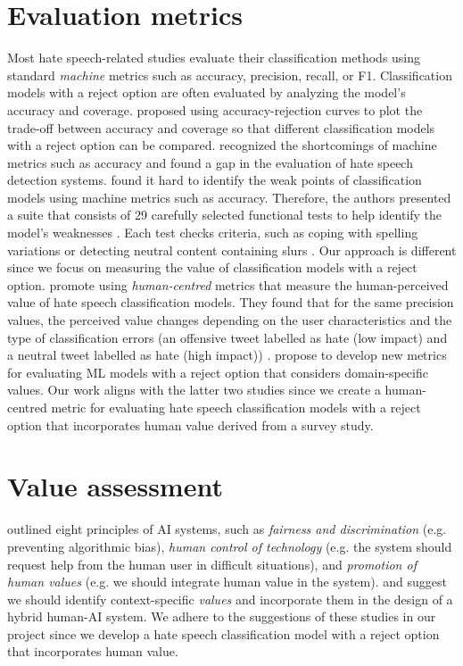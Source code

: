 \section{Evaluation metrics}
\label{sec:related-work-evaluation-metrics}
Most hate speech-related studies evaluate their classification methods using standard \textit{machine} metrics such as accuracy, precision, recall, or F1.
% 
Classification models with a reject option are often evaluated by analyzing the model's accuracy and coverage.
%
\citet{nadeem2009reject} proposed using accuracy-rejection curves to plot the trade-off between accuracy and coverage so that different classification models with a reject option can be compared.
%
\citet{rottger2020hatecheck, casati2021value, olteanu2017limits} recognized the shortcomings of machine metrics such as accuracy and found a gap in the evaluation of hate speech detection systems.
%
\citet{rottger2020hatecheck} found it hard to identify the weak points of classification models using machine metrics such as accuracy.
%
Therefore, the authors presented a suite that consists of 29 carefully selected functional tests to help identify the model's weaknesses \citep{rottger2020hatecheck}.
%
Each test checks criteria, such as coping with spelling variations or detecting neutral content containing slurs \citep{rottger2020hatecheck}.
%
Our approach is different since we focus on measuring the value of classification models with a reject option.
%
\citet{olteanu2017limits} promote using \textit{human-centred} metrics that measure the human-perceived value of hate speech classification models.
%
They found that for the same precision values, the perceived value changes depending on the user characteristics and the type of classification errors (an offensive tweet labelled as hate (low impact) and a neutral tweet labelled as hate (high impact)) \citep{olteanu2017limits}.
%
\citet{casati2021value} propose to develop new metrics for evaluating ML models with a reject option that considers domain-specific values.
%
Our work aligns with the latter two studies since we create a human-centred metric for evaluating hate speech classification models with a reject option that incorporates human value derived from a survey study.


\section{Value assessment}
\label{sec:related-work-value-assessment}
\citet{fjeld2020principled} outlined eight principles of AI systems, such as \emph{fairness and discrimination} (e.g. preventing algorithmic bias), \emph{human control of technology} (e.g. the system should request help from the human user in difficult situations), and \emph{promotion of human values} (e.g. we should integrate human value in the system).
%
\citet{sayin2021science} and \citet{casati2021value} suggest we should identify context-specific \emph{values} and incorporate them in the design of a hybrid human-AI system.
%
We adhere to the suggestions of these studies in our project since we develop a hate speech classification model with a reject option that incorporates human value.
%

